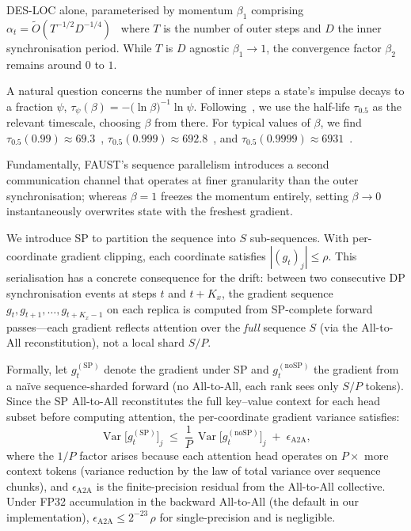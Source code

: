 \documentclass{article}
\begin{document}
DES-LOC alone, parameterised by momentum $\beta_1$ comprising $\alpha_t = \tilde{O}(T^{-1/2} D^{-1/4})$~\citep{cheng2025convergencedistributedadaptiveoptimization} where $T$ is the number of outer steps and $D$ the inner synchronisation period. While
$T$ is $D$ agnostic $\beta_1 \to 1$, the convergence factor $\beta_2$ remains around $0$ to $1$.

A natural question concerns the number of inner steps a state's impulse decays to a fraction $\psi$,
\label{sec:timescales}
$\tau_\psi(\beta) = -\bigl(\ln\beta\bigr)^{-1}\!\ln\!\psi$. Following~\citet{pagliardini2025the}, we use the half-life $\tau_{0.5}$ as the relevant timescale,
choosing $\beta$ from there. For typical values of $\beta$, we find $\tau_{0.5}(0.99) \approx 69.3$~\citep{allal2025smollm2},
$\tau_{0.5}(0.999) \approx 692.8$~\citep{kingma2017adammethodstochasticoptimization}, and $\tau_{0.5}(0.9999) \approx 6931$~\citep{taniguchi2024adoptmodifiedadamconverge}.

Fundamentally, FAUST's sequence parallelism introduces a second communication channel that operates
at finer granularity than the outer synchronisation; whereas $\beta = 1$ freezes the momentum entirely, setting $\beta \to 0$
instantaneously overwrites state with the freshest gradient.

We introduce SP to partition the sequence into $S$ sub-sequences.
With per-coordinate gradient clipping, each coordinate satisfies $|(g_t)_j| \leq \rho$.
This serialisation has a concrete consequence for the drift:
between two consecutive DP synchronisation events at steps $t$ and $t + K_x$, the gradient
sequence $g_t, g_{t+1}, \ldots, g_{t+K_x-1}$ on each replica is computed from SP-complete
forward passes---each gradient reflects attention over the \emph{full} sequence $S$ (via the
All-to-All reconstitution), not a local shard $S/P$.

Formally, let $g_t^{(\text{SP})}$ denote the gradient under SP and $g_t^{(\text{noSP})}$ the gradient
from a na\"ive sequence-sharded forward (no All-to-All, each rank sees only $S/P$ tokens).
Since the SP All-to-All reconstitutes the full key--value context for each head subset before
computing attention, the per-coordinate gradient variance satisfies:
\begin{equation}
\operatorname{Var}\!\bigl[g_t^{(\text{SP})}\bigr]_j
\;\leq\; \frac{1}{P}\,\operatorname{Var}\!\bigl[g_t^{(\text{noSP})}\bigr]_j
\;+\; \epsilon_{\text{A2A}},
\label{eq:sp_var_reduction}
\end{equation}
where the $1/P$ factor arises because each attention head operates on $P{\times}$ more context tokens
(variance reduction by the law of total variance over sequence chunks), and
$\epsilon_{\text{A2A}}$ is the finite-precision residual from the All-to-All collective.
Under FP32 accumulation in the backward All-to-All (the default in our implementation),
$\epsilon_{\text{A2A}} \leq 2^{-23}\,\rho$ for single-precision and is negligible.
\end{document}
